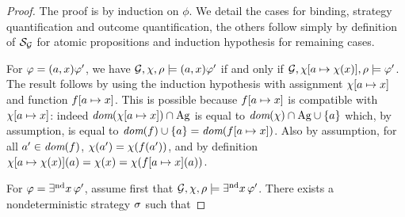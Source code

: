  \begin{proof}
   The proof is by induction on $\phi$.
We detail the cases for binding,  strategy quantification and
outcome quantification, the others follow simply by definition of
$\KS_{\CGS}$ for atomic propositions and induction hypothesis for
remaining cases.

\halfline
For $\varphi=(a,x)\varphi'$, we have
$\CGS,\assign,{\fplay}\models\bind{\var}\phi'$ if and only if 
$\CGS,\assign[\ag\mapsto\assign(\var)],{\fplay}\models\phi'$.
The result follows by using the induction hypothesis with assignment
$\chi[a\mapsto x]$ and function
 $f[a\mapsto x]$. This is possible because $f[a\mapsto x]$ is compatible with $\chi[a\mapsto x]$: indeed
 $\textit{dom}(\chi[a\mapsto x])\cap\textnormal{Ag}$ is equal to
 $\textit{dom}(\chi)\cap\textnormal{Ag} \cup \{a\}$ which, by assumption, is equal
 to $\textit{dom}(f) \cup \{a\}=\textit{dom}(f[a\mapsto
 x])$. Also
 by assumption, for all $a'\in\textit{dom}(f)$, $\chi(a')=\chi(f(a'))$, and 
by definition $\chi[a\mapsto \chi(x)](a)=\chi(x)=\chi(f[a\mapsto x](a))$.


\halfline
For $\varphi=\exists^{\text{nd}} x\,\varphi'$, assume first that
$\CGS,\assign,{\fplay}\models\Estratnd\phi'$. There exists a
nondeterministic strategy $\sigma$ such that



\end{proof}
